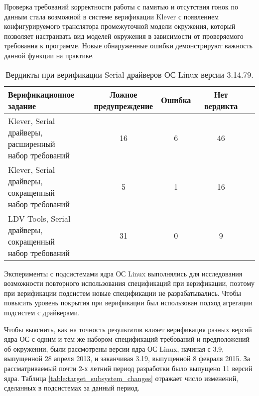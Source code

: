 Проверка требований корректности работы с памятью и отсутствия гонок по данным стала возможной в системе верификации Klever с появлением конфигурируемого транслятора промежуточной модели окружения, который позволяет настраивать вид моделей окружения в зависимости от проверяемого требования к программе.
Новые обнаруженные ошибки демонстрируют важность данной функции на практике.

\begin{table}
\centering
\begin{tabular}{| l | c | c | c | c |}
\hline
\shortstack[l]{Верификационное \\ задание} &
\shortstack[l]{Ложное \\ предупреждение} &
Ошибка & Нет вердикта\\
\hline
\shortstack[l]{Klever, Serial \\ драйверы, расширенный \\ набор требований} & 16  & 6 & 46\\ 
\hline
\shortstack[l]{Klever, Serial \\ драйверы, сокращенный \\ набор требований} & 5  & 1 & 16\\ 
\hline
\shortstack[l]{LDV Tools, Serial \\ драйверы, сокращенный \\ набор требований} & 31  & 0 & 9\\
\hline
\end{tabular}
\caption{Вердикты при верификации Serial драйверов ОС Linux версии 3.14.79.}
\label{table:serialldv}
\end{table}

Эксперименты с подсистемами ядра ОС Linux выполнялись для исследования возможности повторного использования спецификаций при верификации, поэтому при верификации подсистем новые спецификации не разрабатывались.
Чтобы повысить уровень покрытия при верификации был использован подход агрегации подсистем с драйверами.

Чтобы выяснить, как на точность результатов влияет верификация разных версий ядра ОС с одним и тем же набором спецификаций требований и предположений об окружении, были рассмотрены версии ядра ОС Linux, начиная с 3.9, выпущенной 28 апреля 2013, и заканчивая 3.19, выпущенной 8 февраля 2015.
За рассматриваемый почти 2-х летний период разработки было выпущено 11 версий ядра.
Таблица \ref{table:target_subsystem_changes} отражает число изменений, сделанных в подсистемах за данный период.

